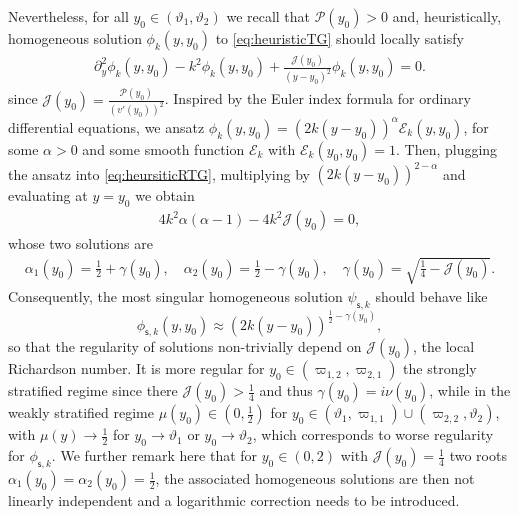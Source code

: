 \documentclass[11pt,reqno]{amsproc}
\theoremstyle{definition}
\numberwithin{equation}{section}
\newcommand{\cJ}{{\mathcal{J}}}
\newcommand{\s}{{\mathsf{s}}}
\renewcommand{\P}{{\mathcal{P}}}
\begin{document}
Nevertheless, for all $y_0\in (\vartheta_1, \vartheta_2)$ we recall that $\P(y_0)>0$ and, heuristically, homogeneous solution $\phi_k(y,y_0)$ to \eqref{eq:heuristicTG} should locally satisfy
\begin{align}\label{eq:heursiticRTG}
\partial_y^2\phi_k(y,y_0) - k^2\phi_k(y,y_0) + \frac{\cJ(y_0)}{(y-y_0)^2}\phi_k(y,y_0) = 0.
\end{align}
since $\cJ(y_0) = \frac{\P(y_0)}{(v'(y_0))^2}$. Inspired by the Euler index formula for ordinary differential equations, we ansatz $\phi_k(y,y_0) = (2k(y-y_0))^\alpha \mathcal{E}_k(y,y_0)$, for some $\alpha>0$ and some smooth function $\mathcal{E}_k$ with $\mathcal{E}_k(y_0,y_0)=1$. Then, plugging the ansatz into \eqref{eq:heursiticRTG}, multiplying by $(2k(y-y_0))^{2-\alpha}$ and evaluating at $y=y_0$ we obtain
\begin{align*}
4k^2\alpha(\alpha-1) - 4k^2 \cJ(y_0) = 0,
\end{align*}
whose two solutions are
\begin{align*}
\alpha_1(y_0) = \frac12 +\gamma(y_0), \quad \alpha_2(y_0) = \frac12-\gamma(y_0),  \quad\gamma(y_0) = \sqrt{\frac14 - \cJ(y_0)}.
\end{align*}
Consequently, the most singular homogeneous solution $\psi_{\s,k}$ should behave like 
$$\phi_{\s,k}(y,y_0) \approx (2k(y-y_0))^{\frac12-\gamma(y_0)},$$
so that the regularity of solutions non-trivially depend on $\cJ(y_0)$, the local Richardson number. It is more regular for $y_0\in (\varpi_{1,2}, \varpi_{2,1})$ the strongly stratified regime since there $\cJ(y_0)>\frac14$ and thus $\gamma(y_0) = i\nu(y_0)$, while in the weakly stratified regime $\mu(y_0)\in (0,\frac12)$ for $y_0\in (\vartheta_1, \varpi_{1,1}) \cup (\varpi_{2,2},\vartheta_2)$, with $\mu(y)\rightarrow \frac12$ for $y_0\rightarrow \vartheta_1$ or $y_0\rightarrow \vartheta_2$, which corresponds to worse regularity for $\phi_{\s,k}$. We further remark here that for $y_0\in (0,2)$ with $\cJ(y_0)=\frac14$ two roots $\alpha_1(y_0)= \alpha_2(y_0)=\frac12$, the associated homogeneous solutions are then not linearly independent and a logarithmic correction needs to be introduced.
\end{document}
